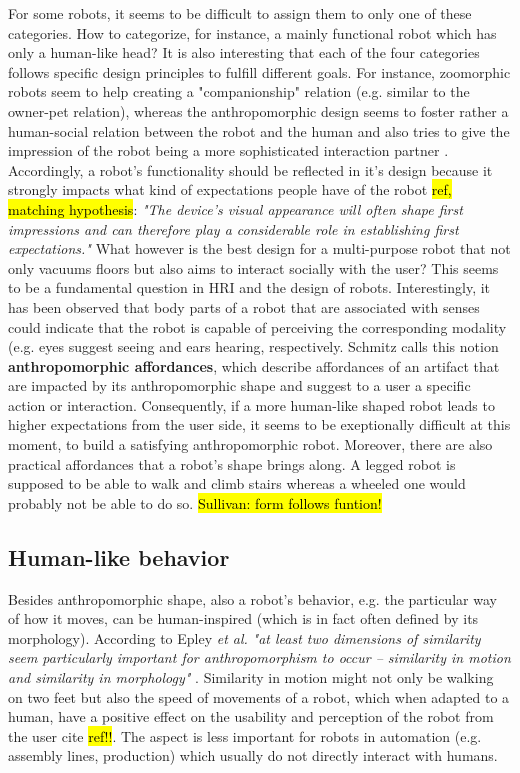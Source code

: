 \documentclass[twocolumn]{svjour3}          %
\begin{document}
	For some robots, it seems to be difficult to assign them to only one of these categories. How to categorize, for instance, a mainly functional robot which has only a human-like head? It is also interesting that each of the four categories follows specific design principles to fulfill different goals. For instance, zoomorphic robots seem to help creating a "companionship" relation (e.g. similar to the owner-pet relation), whereas the anthropomorphic design seems to foster rather a human-social relation between the robot and the human and also tries to give the impression of the robot being a more sophisticated interaction partner \cite{disalvo_all_2002,fong_survey_2003,kiesler_mental_2002}. Accordingly, a robot's functionality should be reflected in it's design because it strongly impacts what kind of expectations people have of the robot \hl{ref, matching hypothesis}: \textit{"The device's visual appearance will often shape first impressions and can therefore play a considerable role in establishing first expectations."} \cite{schmitz_concepts_2011} What however is the best design for a multi-purpose robot that not only vacuums floors but also aims to interact socially with the user? This seems to be a fundamental question in HRI and the design of robots. Interestingly, it has been observed that body parts of a robot that are associated with senses could indicate that the robot is capable of perceiving the corresponding modality (e.g. eyes suggest seeing and ears hearing, respectively. \cite{schmitz_concepts_2011} Schmitz calls this notion \textbf{anthropomorphic affordances}, which describe affordances of an artifact that are impacted by its anthropomorphic shape and suggest to a user a  specific action or interaction. Consequently, if a more human-like shaped robot leads to higher expectations from the user side, it seems to be exeptionally difficult at this moment, to build a satisfying anthropomorphic robot. Moreover, there are also practical affordances that a robot's shape brings along. A legged robot is supposed to be able to walk and climb stairs whereas a wheeled one would probably not be able to do so. \hl{Sullivan: form follows funtion!}
	
\subsection{Human-like behavior}
\label{sec:4.2}

	Besides anthropomorphic shape, also a robot's behavior, e.g. the particular way of how it moves, can be human-inspired (which is in fact often defined by its morphology). According to Epley \textit{et al.} \textit{"at least two dimensions of similarity seem particularly important for anthropomorphism to occur -- similarity in motion and similarity in morphology"} \cite{epley_seeing_2007}. Similarity in motion might not only be walking on two feet but also the speed of movements of a robot, which when adapted to a human, have a positive effect on the usability and perception of the robot from the user cite \hl{ref!!}. The aspect is less important for robots in automation (e.g. assembly lines, production) which usually do not directly interact with humans.
	
\end{document}
